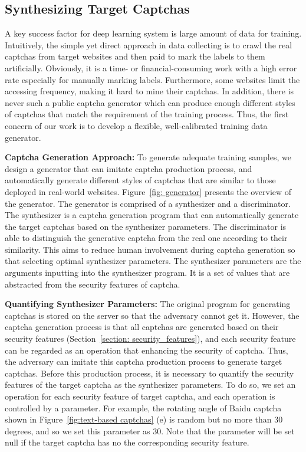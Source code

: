 \subsection{Synthesizing Target Captchas \label{section: captcha_generator}}
A key success factor for deep learning system is large amount of data for training. Intuitively, the simple yet direct approach in data collecting is to crawl the real captchas from target websites and then paid to mark the labels to them artificially. Obviously, it is a time- or financial-consuming work with a high error rate especially for manually marking labels. Furthermore, some websites limit the accessing frequency, making it hard to mine their captchas. In addition, there is never such a public captcha generator which can produce enough different styles of captchas that match the requirement of the training process. Thus, the first concern of our work is to develop a flexible, well-calibrated training data generator.

\noindent \textbf{Captcha Generation Approach:}
To generate adequate training samples, we design a generator that can imitate captcha production process, and automatically generate different styles of captchas that are similar to those deployed in real-world websites. Figure~\ref{fig: generator} presents the overview of the generator. The generator is comprised of a synthesizer and a discriminator. The synthesizer is a captcha generation program that can automatically generate the target captchas based on the synthesizer parameters. The discriminator is able to distinguish the generative captcha from the real one according to their similarity. This aims to reduce human involvement during captcha generation so that selecting optimal synthesizer parameters. The synthesizer parameters are the arguments inputting into the synthesizer program. It is a set of values that are abstracted from the security features of captcha.

\noindent \textbf{Quantifying Synthesizer Parameters:}
The original program for generating captchas is stored on the server so that the adversary cannot get it. However, the captcha generation process is that all captchas are generated based on their security features (Section~\ref{section: security_features}), and each security feature can be regarded as an operation that enhancing the security of captcha. Thus, the adversary can imitate this captcha production process to generate target captchas. Before this production process, it is necessary to quantify the security features of the target captcha as the synthesizer parameters. To do so, we set an operation for each security feature of target captcha, and each operation is controlled by a parameter. For example, the rotating angle of Baidu captcha shown in Figure~\ref{fig:text-based captchas} (e) is random but no more than 30 degrees, and so we set this parameter as 30. Note that the parameter will be set null if the target captcha has no the corresponding security feature.

